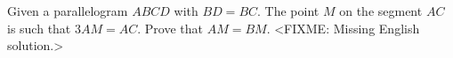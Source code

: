 \problem
Given a parallelogram $ ABCD $ with $ BD = BC $.
The point $M$ on the segment $AC$ is such that $3 AM = AC$.
Prove that $AM = BM$.
\solution
<FIXME: Missing English solution.>
\endproblem
